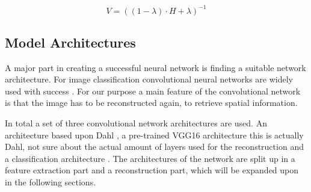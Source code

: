 \begin{equation}
V = ((1 - \lambda)\cdot H + \lambda)^{-1}
\end{equation}
 
\subsection{Model Architectures}
A major part in creating a successful neural network is finding a suitable network architecture. For image classification convolutional neural networks are widely used with success \cite{Krizhevsky,Szegedy,Simonyan}. For our purpose a main feature of the convolutional network is that the image has to be reconstructed again, to retrieve spatial information.

{\color{red} 
In total a set of three convolutional network architectures are used. An architecture based upon Dahl \cite{Dahl}, a pre-trained VGG16 \cite{Simonyan} architecture {\color{red} this is actually Dahl,  not sure about the actual amount of layers used for the reconstruction} and a classification architecture \cite{Zhang}. The architectures of the network are split up in a feature extraction part and a reconstruction part, which will be expanded upon in the following sections.}\\ 
\\%

